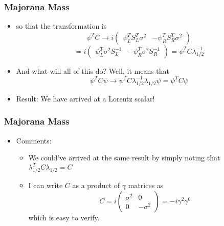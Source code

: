 \documentclass{beamer}
\begin{document}
 
\begin{frame}
	\frametitle{Majorana Mass}
		\begin{itemize}

		\item so that the transformation is 
		\pause
\[
\psi^{T}C\rightarrow i\left(\begin{array}{cc}
\psi_{L}^{T}S_{L}^{T}\sigma^{2} & -\psi_{R}^{T}S_{R}^{T}\sigma^{2}\end{array}\right)\]
\[=i\left(\begin{array}{cc}
\psi_{L}^{T}\sigma^{2}S_{L}^{-1} & -\psi_{R}^{T}\sigma^{2}S_{R}^{-1}\end{array}\right)=\psi^{T}C\lambda_{1/2}^{-1}
\]
\pause

		\item And what will all of this do? Well, it means that 
		\pause
\[
\psi^{T}C\psi\rightarrow\psi^{T}C\lambda_{1/2}^{-1}\lambda_{1/2}\psi=\psi^{T}C\psi
\]
\pause
		\item Result: We have arrived at a Lorentz scalar!

	\end{itemize}
\end{frame}

 









 
\begin{frame}
	\frametitle{Majorana Mass}
		\begin{itemize}
		\item Comments:
		\pause
			\begin{itemize}
				\item We could've arrived at the same result by simply noting that $\lambda_{1/2}^{T}C\lambda_{1/2}=C$
				\pause
				\item I can write $C$ as a product of $\gamma$ matrices as 
				\[
				C=i\left(\begin{array}{cc}
				\sigma^{2} & 0\\
				0 & -\sigma^{2}
				\end{array}\right)=-i\gamma^{2}\gamma^{0}
				\]
				which is easy to verify.
			\end{itemize}
		\end{itemize}
\end{frame}

 
\end{document}
